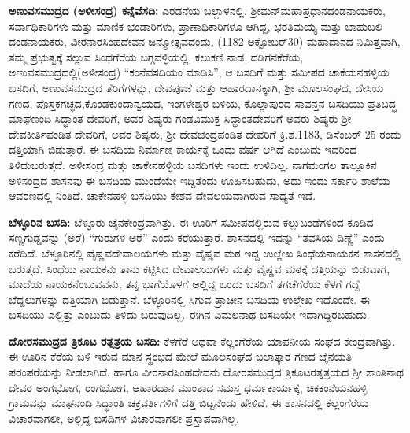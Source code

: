 \textbf{ಅಣುವಸಮುದ್ರದ (ಅಳೀಸಂದ್ರ) ಕನ್ನೆವೆಸದಿ:} ಎರಡನೆಯ ಬಲ್ಲಾಳನಲ್ಲಿ, ಶ‍್ರೀಮನ್​ ಮಹಾಪ್ರಧಾನ\break ದಂಡನಾಯಕರು, ಸರ್ವಾಧಿಕಾರಿಗಳು ಮತ್ತು ಮಾಣಿಕ ಭಂಡಾರಿಗಳು, ಪ್ರಾಣಾಧಿಕಾರಿಗಳೂ ಆಗಿದ್ದ, ಭರತಿಮಯ್ಯ ಮತ್ತು ಬಾಹುಬಲಿ ದಂಡನಾಯಕರು, ವೀರನಾರಸಿಂಹದೇವನ ಜನ್ಮೋತ್ಸವದಂದು, (1182 ಅಕ್ಟೋಬರ್​ 30) ಮಹಾದಾನದ ನಿಮಿತ್ತವಾಗಿ, ತಮ್ಮ ಪ್ರಭುತ್ವಕ್ಕೆ ಸಲ್ಲುವ ಸಿಂಧಗೆರೆಯ ಬಗ್ಗವಳ್ಳಿಯಲ್ಲಿ, ಕಲುಕಣಿ ನಾಡ, ದಡಿಗನಕೆರೆಯ, ಅಣುವಸಮುದ್ರ\-ದಲ್ಲಿ(ಅಳೀಸಂದ್ರ) “ಕಂನೆವಸದಿಯಂ ಮಾಡಿಸಿ”, ಆ ಬಸದಿಗೆ ಮತ್ತು ಸಮೀಪದ ಚಾಕೆಯನಹಳ್ಳಿಯ ಬಸದಿಗೆ, ಅಣುವ\-ಸಮುದ್ರದ ತೆರಿಗೆಗಳನ್ನು, ದೇವಪೂಜೆ ಮತ್ತು ಆಹಾರದಾನಕ್ಕಾಗಿ, ಶ‍್ರೀ ಮೂಲಸಂಘದ, ದೇಸಿಯ ಗಣದ, ಪೊಸ್ತಕಗಚ್ಛದ,\break ಕೊಂಡಕುಂದಾನ್ವಯದ, ಇಂಗಳೇಶ್ವರ ಬಳಿಯ, ಕೊಲ್ಲಾಪುರದ ಸಾವನ್ತನ ಬಸದಿಯು ಪ್ರತಿಬದ್ಧ ಮಾಘಣಂದಿ ಸಿದ್ಧಾಂತ ದೇವರಿಗೆ, ಅವರ ಶಿಷ್ಯರು ಗಂಡವಿಮುಕ್ತ ಸಿದ್ಧಾಂತದೇವರಿಗೆ ಅವರು ಶಿಷ್ಯರು ಶ‍್ರೀ ದೇವಕೀರ್ತಿಪಂಡಿತ ದೇವರಿಗೆ, ಅವರ ಶಿಷ್ಯರು, ಶ‍್ರೀ ದೇವಚಂದ್ರಪಂಡಿತ ದೇವರಿಗೆ ಕ್ರಿ.ಶ.1183, ಡಿಸೆಂಬರ್​ 25 ರಂದು ದತ್ತಿಯಾಗಿ ಬಿಡುತ್ತಾರೆ. ಈ ಬಸದಿಯ ನಿರ್ಮಾಣ ಕಾರ್ಯಕ್ಕೆ ಒಂದು ವರ್ಷ ಆಗಿದೆ ಎಂಬುದು ಇದರಿಂದ ತಿಳಿದುಬರುತ್ತದೆ. ಅಳೀಸಂದ್ರ ಮತ್ತು ಚಾಕೇನಹಳ್ಳಿಯ ಬಸದಿಗಳು ಇಂದು ಉಳಿದಿಲ್ಲ. ನಾಗಮಂಗಲ ತಾಲ್ಲೂಕಿನ ಅಳಿಸಂದ್ರದ ಶಾಸನವು ಈ ಬಸದಿಯ ಮುಂದೆಯೇ ಇದ್ದಿತೆಂದು ಊಹಿಸಬಹುದು, ಅದು ಇಂದು ಸರ್ಕಾರಿ ಶಾಲೆಯ ಆವರಣದಲ್ಲಿ ನಿಂತಿದೆ. ಚಾಕೇನಹಳ್ಳಿ ಬಸದಿಯು ಕೇಶವ ದೇವಲಯ\-ವಾಗಿರುವ ಸಾಧ್ಯತೆ ಇದೆ.

\textbf{ಬೆಳ್ಳೂರಿನ ಬಸದಿ:} ಬೆಳ್ಳೂರು ಜೈನಕೇಂದ್ರವಾಗಿತ್ತು. ಈ ಊರಿಗೆ ಸಮೀಪದಲ್ಲಿರುವ ಕಲ್ಲುಬಂಡೆಗಳಿಂದ ಕೂಡಿದ ಸಣ್ಣಗುಡ್ಡವನ್ನು (ಅರೆ) “ಗುರುಗಳ ಅರೆ” ಎಂದು ಕರೆಯುತ್ತಾರೆ. ಶಾಸನದಲ್ಲಿ ಇದನ್ನು “ತವಸಿಯ ದಿಣ್ಣೆ” ಎಂದು ಕರೆದಿದೆ. ಬೆಳ್ಳೂರಿನಲ್ಲಿ ವೈಷ್ಣವದೇವಾಲಯಗಳು ಮತ್ತು ವೈಷ್ಣವ ಮಠ ಇದ್ದ ಉಲ್ಲೇಖ ಸಿಂಧೆಯನಾಯಕನ ಶಾಸನದಲ್ಲಿ ಬರುತ್ತದೆ. ಸಿಂಧೆಯ ನಾಯಕನು ತಾನು ಕಟ್ಟಿಸಿದ ದೇವಾಲಯಗಳು ಮತ್ತು ವೈಷ್ಣವ ಮಠಕ್ಕೆ ದತ್ತಿಯನ್ನು ಬಿಡುವಾಗ, ಮಾದೆಯ ನಾಯಕನೆಂಬುವವನು, ತನ್ನ ಭಾಗೆಯೊಳಗೆ ಅಲ್ಲಿದ್ದ ಒಂದು ಬಸದಿಗೆ ತಗಚೆಗೆರೆಯ ಕೆಳಗೆ ಗದ್ದೆ ಬೆದ್ದಲುಗಳನ್ನು ದತ್ತಿಯಾಗಿ ಬಿಡುತ್ತಾನೆ. ಬೆಳ್ಳೂರಿನಲ್ಲಿ ಸಿಗುವ ಪ್ರಾಚೀನ ಬಸದಿಯ ಉಲ್ಲೇಖ ಇದೊಂದೇ. ಈ ಬಸದಿಯು ಎಲ್ಲಿತ್ತು ಎಂಬುದು ತಿಳಿದು ಬರುವುದಿಲ್ಲ. ಈಗಿನ ವಿಮಲನಾಥ ಬಸದಿಯೇ ಇದಾಗಿದ್ದಿರಬಹುದು.

\textbf{ದೋರಸಮುದ್ರದ ತ್ರಿಕೂಟ ರತ್ನತ್ರಯ ಬಸದಿ:} ಕೆಳಗೆರೆ ಅಥವಾ ಕೆಲ್ಲಂಗೆರೆಯ ಯಾಪನೀಯ ಸಂಘದ ಕೇಂದ್ರ\-ವಾಗಿತ್ತು. ಈ ಊರಿನ ಕೆರೆಯ ಬಳಿ ಇರುವ ಮಾನ ಸ್ಥಂಭದ ಮೇಲೆ ಮೂಲಸಂಘದ ಬಲಾತ್ಕಾರ ಗಣದ ಜೈನಯತಿ ಪರಂಪರೆಯನ್ನು ನೀಡಲಾಗಿದೆ. ಹಾಗೂ ವೀರನಾರಸಿಂಹದೇವನು ದೋರಸಮುದ್ರದ ತ್ರಿಕೂಟರತ್ನತ್ರಯದ ಶ‍್ರೀ ಶಾಂತಿನಾಥ ದೇವರ ಅಂಗಭೋಗ, ರಂಗಭೋಗ, ಆಹಾರದಾನ ಮುಂತಾದ ಸಮಸ್ತ ಧರ್ಮಕಾರ್ಯಕ್ಕೆ, ಚಿಕಕಂನೆಯನಹಳ್ಳಿ ಗ್ರಾಮವನ್ನು ಮಾಘನಂದಿ ಸಿದ್ಧಾಂತಿ ಚಕ್ರವರ್ತಿಗಳಿಗೆ ದತ್ತಿ ಬಿಟ್ಟನೆಂದು ಹೇಳಿದೆ. ಈ ಶಾಸನದಲ್ಲಿ ಕೆಲ್ಲಂಗೆರೆಯ ವಿಚಾರವಾಗಲೀ, ಅಲ್ಲಿದ್ದ ಬಸದಿಗಳ ವಿಚಾರವಾಗಲೀ ಪ್ರಸ್ತಾಪವಾಗಿಲ್ಲ.

